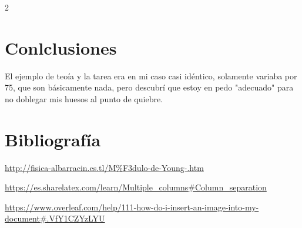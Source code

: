 \documentclass[11pt,a4paper]{article}
\begin{document}
\begin{multicols} {2}


\section{Conlclusiones}
El ejemplo de teo\'ia y la tarea era en mi caso casi id\'entico, solamente variaba por 75, que son b\'asicamente nada, pero descubr\'i que estoy en pedo "adecuado" para no doblegar mis huesos al punto de quiebre.
\end{multicols}
 
\section{Bibliograf\'ia}
\url{http://fisica-albarracin.es.tl/M%F3dulo-de-Young-.htm}

\url{https://es.sharelatex.com/learn/Multiple_columns#Column_separation}

\url{https://www.overleaf.com/help/111-how-do-i-insert-an-image-into-my-document#.VfY1CZYzLYU}
\end{document}
